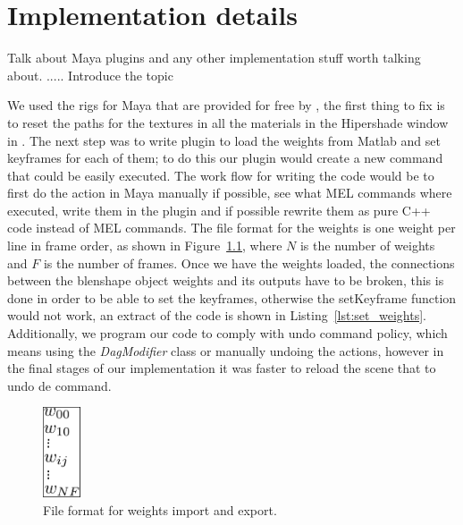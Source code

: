 \chapter{Implementation details}
\label{sec:implementation_details}

Talk about Maya plugins and any other implementation stuff worth talking about. 
..... Introduce the topic

We used the rigs for Maya that are provided for free by \cite{FaceWareRigsWeb}, the first thing to fix is to reset the paths for the textures in all the materials in the Hipershade window in \Maya.
The next step was to write plugin to load the weights from Matlab and set keyframes for each of them; to do this our plugin would create a new \Maya command that could be easily executed. 
The work flow for writing the code would be to first do the action in Maya manually if possible, see what MEL commands where executed, write them in the plugin and if possible rewrite them as pure C++ code instead of MEL commands.
The file format for the weights is one weight per line in frame order, as shown in Figure~\ref{fig:file_format}, where $N$ is the number of weights and $F$ is the number of frames.
Once we have the weights loaded, the connections between the blenshape object weights and its outputs have to be broken, this is done in order to be able to set the keyframes, otherwise the setKeyframe function would not work, an extract of the code is shown in Listing~\ref{lst:set_weights}.
Additionally, we program our code to comply with \Maya undo command policy, which means using the \emph{DagModifier} class or manually undoing the actions, however in the final stages of our implementation it was faster to reload the scene that to undo de command.

\begin{figure}[htbp!]
\centering
\includegraphics[width=0.1\textwidth]{img/file_format}
	\caption{File format for weights import and export.}
	\label{fig:file_format}
\end{figure}

